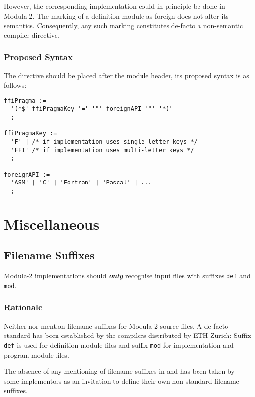 \documentclass[10pt,a4paper]{article}
\renewcommand{\emph}[1]{\textbf{\textit{#1}}}
\begin{document}
However, the corresponding implementation could in principle be done in
Modula-2. The marking of a definition module as foreign does not alter its
semantics. Consequently, any such marking constitutes de-facto a
\gls{non-semantic compiler directive}.

\subsubsection{Proposed Syntax}

The directive should be placed after the module header, its proposed syntax
is as follows:

\begin{verbatim}
ffiPragma :=
  '(*$' ffiPragmaKey '=' '"' foreignAPI '"' '*)'
  ;
  
ffiPragmaKey :=
  'F' | /* if implementation uses single-letter keys */
  'FFI' /* if implementation uses multi-letter keys */
  ; 

foreignAPI :=
  'ASM' | 'C' | 'Fortran' | 'Pascal' | ...
  ;
\end{verbatim}


\section{Miscellaneous}

\subsection{Filename Suffixes}

Modula-2 implementations should \emph{only} recognise input files with
suffixes \verb|def| and \verb|mod|.

\subsubsection{Rationale}

Neither \cite{Wirth78} nor \cite{Wirth88} mention filename suffixes for
Modula-2 source files. A de-facto standard has been established by the
compilers distributed by \Gls{ETH} Z\"{u}rich: Suffix \verb|def| is used for
definition module files and suffix \verb|mod| for implementation and program
module files.

The absence of any mentioning of filename suffixes in \cite{Wirth78} and
\cite{Wirth88} has been taken by some implementors as an invitation to
define their own non-standard filename suffixes.
\end{document}
